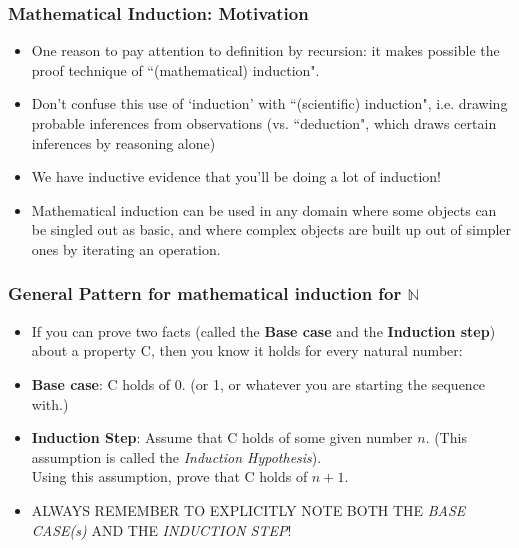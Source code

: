  \begin{frame}
\frametitle{Mathematical Induction: Motivation}

\begin{itemize}[<+->]
\item One reason to pay attention to definition by recursion: it makes possible the proof technique of ``(mathematical) induction".

\item Don't confuse this use of `induction' with ``(scientific) induction", i.e. drawing probable inferences from observations (vs. ``deduction", which draws certain inferences by reasoning alone) %


\item We have inductive evidence that you'll be doing a lot of induction!


\item 	Mathematical induction can be used in any domain where some objects can be singled out as basic, and where complex objects are built up out of simpler ones by iterating an operation.  


\end{itemize} 
\end{frame}



 \begin{frame}
\frametitle{General Pattern for mathematical induction for $\mathbb{N}$}

\begin{itemize}[<+->]

\item  If you can prove two facts (called the {\bf{Base case}} and the {\bf{Induction step}}) about a property C, then you know it holds for every natural number:

\bi

\item {\bf{Base case}}: C holds of 0. (or 1, or whatever you are starting the sequence with.)\\

\item {\bf{Induction Step}}: Assume that C holds of some given number $n$. (This assumption is called the {\it{Induction Hypothesis}}). \\ Using this assumption, prove that C holds of $n+1$.

\ei 

\bigskip

\item ALWAYS REMEMBER TO EXPLICITLY NOTE BOTH THE \emph{BASE CASE(s)} AND THE \emph{INDUCTION STEP}!


\end{itemize} 
\end{frame}

